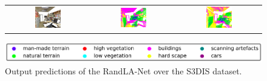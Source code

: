 \begin{figure}[h!]
\begin{tabular}{ccc}
            \includegraphics[width=0.33\textwidth, height=0.18\textheight]{images/seg_output/s3dis_DE/S3DIS_4_RGB.pdf} &
            \includegraphics[width=0.33\textwidth, height=0.18\textheight]{images/seg_output/s3dis_DE/S3DIS_4_Pred.pdf}&
            \includegraphics[width=0.33\textwidth, height=0.18\textheight]{images/seg_output/s3dis_DE/office_42.pdf} \\
        \end{tabular}
        \includegraphics[scale=0.45]{images/legend.png}
        \caption{Output predictions of the RandLA-Net over the S3DIS dataset.}
        \label{fig:de_s3dis_vis}
    \end{figure}

